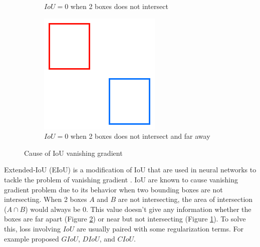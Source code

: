 \begin{figure}[H]
\begin{subfigure}[][][t]{0.3\textwidth}
        \caption{$IoU = 0$ when 2 boxes does not intersect}
        \label{fig:iou0near}
      \end{subfigure}\hfill
      \begin{subfigure}[][][t]{0.3\textwidth}
        \includegraphics[width=1\linewidth]{figures/iou0far.png}
        \caption{$IoU = 0$ when 2 boxes does not intersect and far away}
        \label{fig:iou0far}
      \end{subfigure}
      \caption{Cause of IoU vanishing gradient}
      \label{fig:iouvanishinggrad}
  \end{figure}
  Extended-IoU (EIoU) is a modification of IoU that are used in neural networks to tackle
  the problem of vanishing gradient \parencite{eiou}. 
  IoU are known to cause vanishing gradient problem due to its behavior when two bounding boxes are not intersecting.
  When 2 boxes $A$ and $B$ are not intersecting, the area of intersection ($A\cap B$) would always be 0.
  This value doesn't give any information whether the boxes are far apart (Figure \ref{fig:iou0far}) or 
  near but not intersecting (Figure \ref{fig:iou0near}).
  To solve this, loss involving $IoU$ are usually paired with some regularization terms.
  For example \textcites{giou}{diou_ciou} proposed $GIoU$, $DIoU$, and $CIoU$.
  
